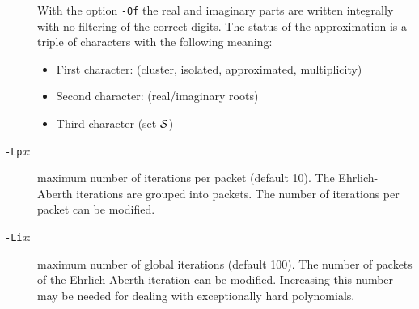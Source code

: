 \documentclass{article}
\begin{document}
\begin{description}
With the option {\tt -Of} the real and imaginary parts are written
integrally with no filtering of the correct digits. The status of the
approximation is a triple of characters with the following meaning:
\begin{itemize}
  \item First character: (cluster, isolated, approximated, multiplicity)
  \item Second character: (real/imaginary roots)
  \item Third character (set $\cal S$)
\end{itemize}


\item[{\tt -Lp}{\em x}:] maximum number of  iterations per packet (default 10).
     The Ehrlich-Aberth iterations are grouped into packets. The number of 
     iterations per packet can be modified.
 
\item[{\tt -Li}{\em x}:]  maximum number of global iterations (default 100). 
The number of packets of the Ehrlich-Aberth iteration can be modified.
Increasing this number may be needed for dealing with exceptionally hard 
polynomials.

\end{description}
\end{document}
